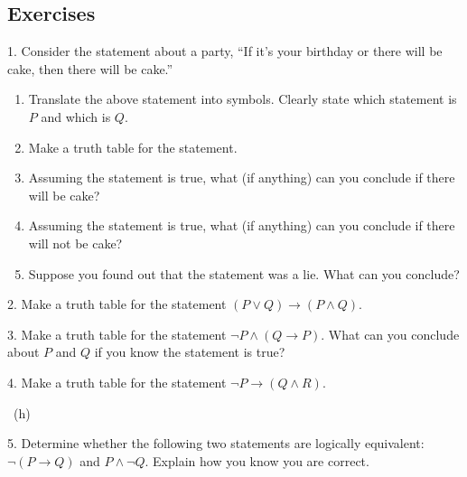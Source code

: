 \documentclass[10pt,]{book}
\theoremstyle{plain}
\theoremstyle{definition}
\theoremstyle{definition}
\theoremstyle{definition}
\numberwithin{equation}{chapter}
\def\imp{\rightarrow}
\begin{document}
\subsection*{Exercises}\label{exercises_sec-logic}
\begin{exerciselist}
\item[1.]\hypertarget{exercise-99}{}\hypertarget{p-2348}{}%
Consider the statement about a party, ``If it's your birthday or there will be cake, then there will be cake.''%
\par
\hypertarget{p-2349}{}%
\leavevmode%
\begin{enumerate}[label=(\alph*)]
\item\hypertarget{li-476}{}\hypertarget{p-2350}{}%
Translate the above statement into symbols. Clearly state which statement is \(P\) and which is \(Q\).%
\item\hypertarget{li-477}{}\hypertarget{p-2351}{}%
Make a truth table for the statement.%
\item\hypertarget{li-478}{}\hypertarget{p-2352}{}%
Assuming the statement is true, what (if anything) can you conclude if there will be cake?%
\item\hypertarget{li-479}{}\hypertarget{p-2353}{}%
Assuming the statement is true, what (if anything) can you conclude if there will not be cake?%
\item\hypertarget{li-480}{}\hypertarget{p-2354}{}%
Suppose you found out that the statement was a lie. What can you conclude?%
\end{enumerate}
%
\par\smallskip
\item[2.]\hypertarget{exercise-100}{}\hypertarget{p-2360}{}%
Make a truth table for the statement \((P \vee Q) \imp (P \wedge Q)\).%
\par\smallskip
\item[3.]\hypertarget{exercise-101}{}\hypertarget{p-2361}{}%
Make a truth table for the statement \(\neg P \wedge (Q \imp P)\). What can you conclude about \(P\) and \(Q\) if you know the statement is true?%
\par\smallskip
\item[4.]\hypertarget{exercise-102}{}\hypertarget{p-2363}{}%
Make a truth table for the statement \(\neg P \imp (Q \wedge R)\).%
\par\smallskip
~{\tiny (h)}\item[5.]\hypertarget{exercise-103}{}\hypertarget{p-2365}{}%
Determine whether the following two statements are logically equivalent:  \(\neg(P \imp Q)\) and \(P \wedge \neg Q\). Explain how you know you are correct.%

\end{exerciselist}
\end{document}
